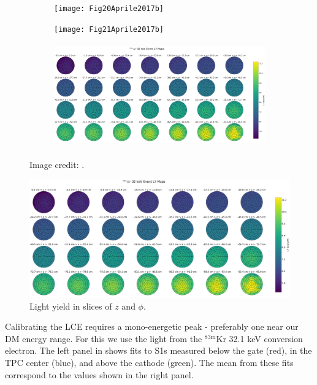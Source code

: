 {\begin{figure}
    \centering
    \begin{subfigure}[t]{0.45\textwidth}
        \centering
        \texttt{[image: Fig20Aprile2017b]}
        \label{fig:calibrations_lce_lce_hist}
    \end{subfigure}%
    \begin{subfigure}[t]{0.45\textwidth}
        \centering
        \texttt{[image: Fig21Aprile2017b]} \\
        \label{fig:calibrations_lce_cle_map}
    \end{subfigure}
    \begin{subfigure}[b]{\textwidth}
        \centering
        \includegraphics[height=4.5cm]{LCEMapPolar}
        \label{fig:calibrations_lce_cle_map}
    \end{subfigure}
    \caption{Image credit: .}
	\label{fig:calibrations_lce_lce}
\end{figure}

\begin{figure}
\centering
\includegraphics[width=\textwidth]{LCEMapPolar}
\caption{Light yield in slices of $z$ and $\phi$.}
\label{fig:calibrations_lce_polar}
\end{figure}

Calibrating the LCE requires a mono-energetic peak - preferably one near our DM energy range.  For this we use the light from the
$\mathrm{^{83m}Kr}$ 32.1 keV conversion electron.  The left panel in  shows fits to S1s measured below the gate
(red), in the TPC center (blue), and above the cathode (green).  The mean from these fits correspond to the values shown in the right
panel.

}
